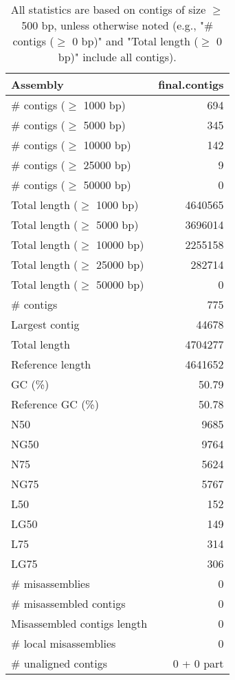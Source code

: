 \documentclass[12pt,a4paper]{article}
\begin{document}
\begin{table}[ht]
\begin{center}
\caption{All statistics are based on contigs of size $\geq$ 500 bp, unless otherwise noted (e.g., "\# contigs ($\geq$ 0 bp)" and "Total length ($\geq$ 0 bp)" include all contigs).}
\begin{tabular}{|l*{1}{|r}|}
\hline
Assembly & final.contigs \\ \hline
\# contigs ($\geq$ 1000 bp) & 694 \\ \hline
\# contigs ($\geq$ 5000 bp) & 345 \\ \hline
\# contigs ($\geq$ 10000 bp) & 142 \\ \hline
\# contigs ($\geq$ 25000 bp) & 9 \\ \hline
\# contigs ($\geq$ 50000 bp) & 0 \\ \hline
Total length ($\geq$ 1000 bp) & 4640565 \\ \hline
Total length ($\geq$ 5000 bp) & 3696014 \\ \hline
Total length ($\geq$ 10000 bp) & 2255158 \\ \hline
Total length ($\geq$ 25000 bp) & 282714 \\ \hline
Total length ($\geq$ 50000 bp) & 0 \\ \hline
\# contigs & 775 \\ \hline
Largest contig & 44678 \\ \hline
Total length & 4704277 \\ \hline
Reference length & 4641652 \\ \hline
GC (\%) & 50.79 \\ \hline
Reference GC (\%) & 50.78 \\ \hline
N50 & 9685 \\ \hline
NG50 & 9764 \\ \hline
N75 & 5624 \\ \hline
NG75 & 5767 \\ \hline
L50 & 152 \\ \hline
LG50 & 149 \\ \hline
L75 & 314 \\ \hline
LG75 & 306 \\ \hline
\# misassemblies & 0 \\ \hline
\# misassembled contigs & 0 \\ \hline
Misassembled contigs length & 0 \\ \hline
\# local misassemblies & 0 \\ \hline
\# unaligned contigs & 0 + 0 part \\ \hline

\end{tabular}
\end{center}
\end{table}
\end{document}
